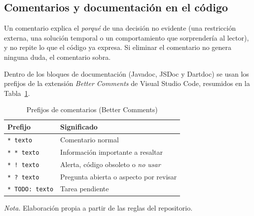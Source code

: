 \subsection{Comentarios y documentación en el código}

Un comentario explica el \textit{porqué} de una decisión no evidente (una restricción externa, una solución temporal o un comportamiento que sorprendería al lector), y no repite lo que el código ya expresa. Si eliminar el comentario no genera ninguna duda, el comentario sobra.

Dentro de los bloques de documentación (Javadoc, JSDoc y Dartdoc) se usan los prefijos de la extensión \textit{Better Comments} de Visual Studio Code, resumidos en la Tabla~\ref{tab:estandar_comentarios}.

\begin{table}[H]
\caption{Prefijos de comentarios (Better Comments)}
\label{tab:estandar_comentarios}
\begin{threeparttable}
\begin{tabular}{>{\raggedright\arraybackslash}p{4.0cm} >{\raggedright\arraybackslash}p{8.8cm}}
\toprule
Prefijo & Significado \\
\midrule
\texttt{* texto} & Comentario normal \\
\texttt{* * texto} & Información importante a resaltar \\
\texttt{* ! texto} & Alerta, código obsoleto o \textit{no usar} \\
\texttt{* ? texto} & Pregunta abierta o aspecto por revisar \\
\texttt{* TODO: texto} & Tarea pendiente \\
\bottomrule
\end{tabular}
\begin{tablenotes}
\item \textit{Nota.} Elaboración propia a partir de las reglas del repositorio.
\end{tablenotes}
\end{threeparttable}
\end{table}
